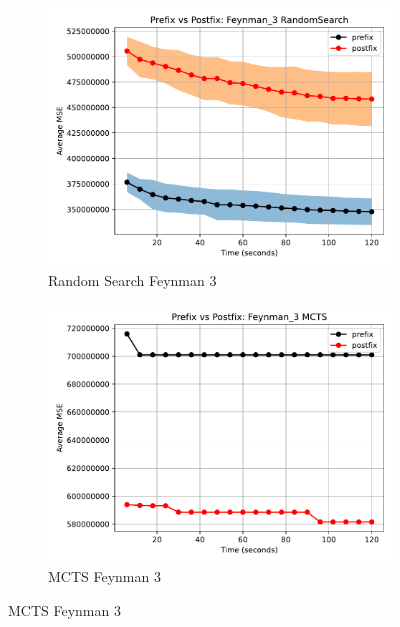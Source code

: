 \documentclass[12pt]{iopart}
\begin{document}
\begin{figure}
    \centering
    
    \begin{subfigure}[b]{0.4\textwidth}
        \includegraphics[width=\linewidth, keepaspectratio]{AIFeynman_Benchmarks/PrePostFeynman_3RandomSearch.pdf}
        \caption{Random Search Feynman 3}
        \label{subfig:feynman_3_RS}
    \end{subfigure}
    \begin{subfigure}[b]{0.4\textwidth}
        \includegraphics[width=\linewidth, keepaspectratio]{AIFeynman_Benchmarks/PrePostFeynman_3MCTS.pdf}
        \caption{MCTS Feynman 3}
        \label{subfig:feynman_3_MCTS}
    \end{subfigure}
    

\end{figure}
\end{document}
